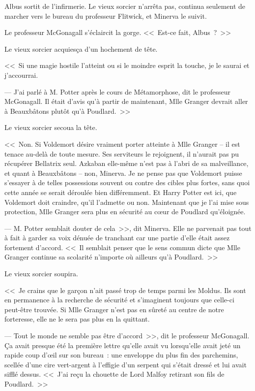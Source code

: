 Albus sortit de l'infirmerie. Le vieux sorcier n'arrêta pas, continua seulement de marcher vers le bureau du professeur Flitwick, et Minerva le suivit.

Le professeur McGonagall s'éclaircit la gorge. <<~Est-ce fait, Albus~?~>>

Le vieux sorcier acquiesça d'un hochement de tête.

<<~Si une magie hostile l'atteint ou si le moindre esprit la touche, je le saurai et j'accourrai.

--- J'ai parlé à M. Potter après le cours de Métamorphose, dit le professeur McGonagall. Il était d'avis qu'à partir de maintenant, Mlle Granger devrait aller à Beauxbâtons plutôt qu'à Poudlard.~>>

Le vieux sorcier secoua la tête.

<<~Non. Si Voldemort désire vraiment porter atteinte à Mlle Granger -- il est tenace au-delà de toute mesure. Ses serviteurs le rejoignent, il n'aurait pas pu récupérer Bellatrix seul. Azkaban elle-même n'est pas à l'abri de sa malveillance, et quant à Beauxbâtons -- non, Minerva. Je ne pense pas que Voldemort puisse s'essayer à de telles possessions souvent ou contre des cibles plus fortes, sans quoi cette année se serait déroulée bien différemment. Et Harry Potter est ici, que Voldemort doit craindre, qu'il l'admette ou non. Maintenant que je l'ai mise sous protection, Mlle Granger sera plus en sécurité au cœur de Poudlard qu'éloignée.

--- M. Potter semblait douter de cela~>>, dit Minerva. Elle ne parvenait pas tout à fait à garder sa voix dénuée de tranchant car une partie d'elle était assez fortement d'accord. <<~Il semblait penser que le sens commun dicte que Mlle Granger continue sa scolarité n'importe où ailleurs qu'à Poudlard.~>>

Le vieux sorcier soupira.

<<~Je crains que le garçon n'ait passé trop de temps parmi les Moldus. Ils sont en permanence à la recherche de sécurité et s'imaginent toujours que celle-ci peut-être trouvée. Si Mlle Granger n'est pas en sûreté au centre de notre forteresse, elle ne le sera pas plus en la quittant.

--- Tout le monde ne semble pas être d'accord~>>, dit le professeur McGonagall. Ça avait presque été la première lettre qu'elle avait vu lorsqu'elle avait jeté un rapide coup d'œil sur son bureau~: une enveloppe du plus fin des parchemins, scellée d'une cire vert-argent à l'effigie d'un serpent qui s'était dressé et lui avait sifflé dessus. <<~J'ai reçu la chouette de Lord Malfoy retirant son fils de Poudlard.~>>

